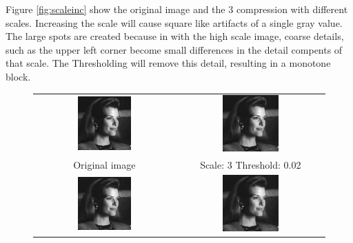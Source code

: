 \documentclass[a4paper]{article}
\begin{document}
\begin{enumerate}
Figure \ref{fig:scaleinc} show the original image and the 3 compression with different scales.
Increasing the scale will cause square like artifacts of a single gray value.
The large spots are created because in with the high scale image, coarse details, such as the upper left corner become
small differences in the detail compents of that scale. 
The Thresholding will remove this detail, resulting in a monotone block.


\begin{figure}[H]
\centering
\begin{tabular}{cc}
 \includegraphics[width=0.4\textwidth]{../lab3ex3/tracy.png} & \includegraphics[width=0.4\textwidth]{../lab3ex3/l3t002.png} \\
 Original image & Scale: 3 Threshold: 0.02 \\
 \includegraphics[width=0.4\textwidth]{../lab3ex3/l3t005.png} & \includegraphics[width=0.4\textwidth]{../lab3ex3/l3t010.png}  \\

\end{tabular}
\end{figure}
\end{enumerate}
\end{document}
